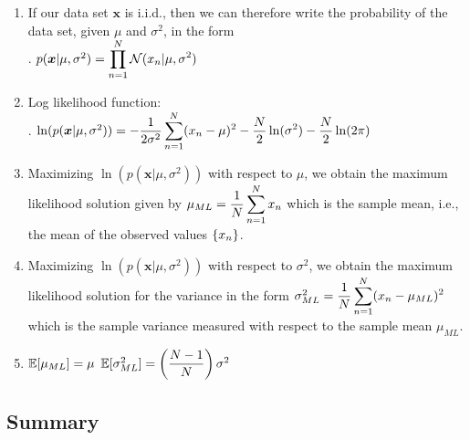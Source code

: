 \begin{enumerate}
    \item If our data set $\bm{x}$ is i.i.d., then we can therefore write the probability of the data set, given $\mu$  and $\sigma^2$, in the form
    \hfill \cite{ml/book/Pattern-Recognition-And-Machine-Learning/Christopher-M-Bishop}
    \\
    .\hfill
    $
        p(\bm{x}|\mu , \sigma^2)
        = \displaystyle\prod^{N}_{n=1} \mathcal{N} (x_n|\mu , \sigma^2)
    $
    \hfill \cite{ml/book/Pattern-Recognition-And-Machine-Learning/Christopher-M-Bishop}

    \item Log likelihood function:
    \hfill \cite{ml/book/Pattern-Recognition-And-Machine-Learning/Christopher-M-Bishop}
    \\
    .\hfill
    $
        \ln (p (\bm{x}|\mu , \sigma ^2))
        = - \dfrac{1}{2\sigma ^2} \displaystyle\sum^N_{n=1} (x_n - \mu )^2 - \dfrac{N }{2} \ln (\sigma ^2) - \dfrac{N }{2} \ln(2\pi)
    $
    \hfill \cite{ml/book/Pattern-Recognition-And-Machine-Learning/Christopher-M-Bishop}

    \item Maximizing $\ln (p (\bm{x}|\mu , \sigma ^2))$ with respect to $\mu$, we obtain the maximum likelihood solution given by
    $
        \mu_{ML}
        = \dfrac{1}{N} \displaystyle\sum_{n=1}^N x_n
    $
    which is the sample mean, i.e., the mean of the observed values $\left\{x_n\right\}$.
    \hfill \cite{ml/book/Pattern-Recognition-And-Machine-Learning/Christopher-M-Bishop}

    \item Maximizing $\ln (p (\bm{x}|\mu , \sigma ^2))$ with respect to $\sigma^2$, we obtain the maximum likelihood solution for the variance in the form
    $
        \sigma^2 _{ML} = \dfrac{1}{N} \displaystyle\sum^N _{n=1} (x_n - \mu _{ML})^2
    $
    which is the sample variance measured with respect to the sample mean $\mu _{ML}$.
    \hfill \cite{ml/book/Pattern-Recognition-And-Machine-Learning/Christopher-M-Bishop}

    \item
    $\mathbb{E}[\mu _{ML}] = \mu $
    \hfill
    $\mathbb{E}[\sigma ^2_{ML}] = \left(\dfrac{N - 1}{N}\right) \sigma ^2$
    \hfill \cite{ml/book/Pattern-Recognition-And-Machine-Learning/Christopher-M-Bishop}
\end{enumerate}







\subsection{Summary}

